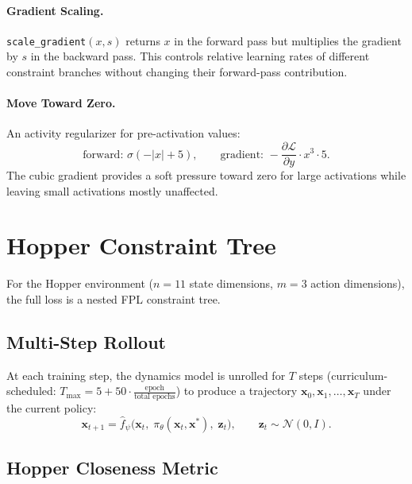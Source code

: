 \documentclass[11pt]{article}
\newcommand{\x}{\bm{x}}
\newcommand{\xstar}{\bm{x}^*}
\theoremstyle{definition}
\begin{document}
\paragraph{Gradient Scaling.}
\texttt{scale\_gradient}$(x, s)$ returns $x$ in the forward pass but
multiplies the gradient by $s$ in the backward pass.  This controls relative
learning rates of different constraint branches without changing their
forward-pass contribution.

\paragraph{Move Toward Zero.}
An activity regularizer for pre-activation values:
\[
    \text{forward: } \sigma(-|x| + 5), \qquad
    \text{gradient: } -\frac{\partial \mathcal{L}}{\partial y} \cdot x^3 \cdot 5.
\]
The cubic gradient provides a soft pressure toward zero for large activations
while leaving small activations mostly unaffected.

\section{Hopper Constraint Tree}\label{sec:loss_tree}

For the Hopper environment ($n = 11$ state dimensions, $m = 3$ action
dimensions), the full loss is a nested FPL constraint tree.

\subsection{Multi-Step Rollout}

At each training step, the dynamics model is unrolled for $T$ steps
(curriculum-scheduled: $T_{\max} = 5 + 50 \cdot \frac{\text{epoch}}{\text{total epochs}}$)
to produce a trajectory
$\x_0, \x_1, \dots, \x_T$ under the current policy:
\[
    \x_{t+1} = \hat{f}_\psi\bigl(\x_t,\; \pi_\theta(\x_t, \xstar),\; \bm{z}_t\bigr),
    \qquad \bm{z}_t \sim \mathcal{N}(0, I).
\]

\subsection{Hopper Closeness Metric}
\end{document}

